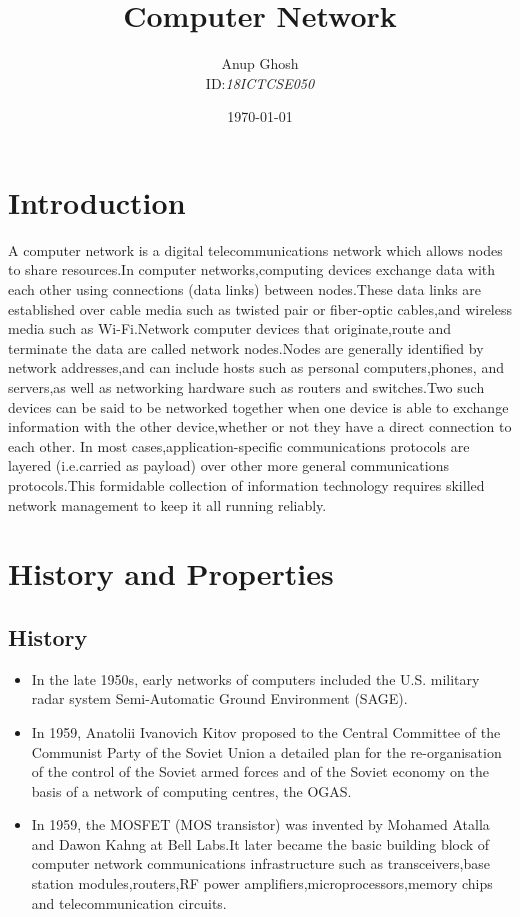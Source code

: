\documentclass{article}
\title{\textbf{Computer Network}}
\author{Anup Ghosh\\ID:\textit{18ICTCSE050}}
\date{\today}
\begin{document}
\maketitle

\newpage
{}
\tableofcontents
\newpage
\section*{Introduction}
A computer network is a digital telecommunications network which allows nodes to share resources.In computer networks,computing devices exchange data with each other using connections (data links) between nodes.These data links are established over cable media such as twisted pair or fiber-optic cables,and wireless media such as Wi-Fi.Network computer devices that originate,route and terminate the data are called network nodes.Nodes are generally identified by network addresses,and can include hosts such as personal computers,phones, and servers,as well as networking hardware such as routers and switches.Two such devices can be said to be networked together when one device is able to exchange information with the other device,whether or not they have a direct connection to each other. In most cases,application-specific communications protocols are layered (i.e.carried as payload) over other more general communications protocols.This formidable collection of information technology requires skilled network management to keep it all running reliably.
\newpage
\section{History and Properties}
\subsection{History}
\begin{itemize}
\item In the late 1950s, early networks of computers included the U.S. military radar system Semi-Automatic Ground Environment (SAGE).\item In 1959, Anatolii Ivanovich Kitov proposed to the Central Committee of the Communist Party of the Soviet Union a detailed plan for the re-organisation of the control of the Soviet armed forces and of the Soviet economy on the basis of a network of computing centres, the OGAS.\item In 1959, the MOSFET (MOS transistor) was invented by Mohamed Atalla and Dawon Kahng at Bell Labs.It later became the basic building block of computer network communications infrastructure such as transceivers,base station modules,routers,RF power amplifiers,microprocessors,memory chips and telecommunication circuits.
\end{itemize}
\end{document}

